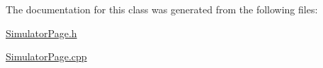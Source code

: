 The documentation for this class was generated from the following files\-:\begin{DoxyCompactItemize}
\item 
\hyperlink{SimulatorPage_8h}{Simulator\-Page.\-h}\item 
\hyperlink{SimulatorPage_8cpp}{Simulator\-Page.\-cpp}\end{DoxyCompactItemize}

